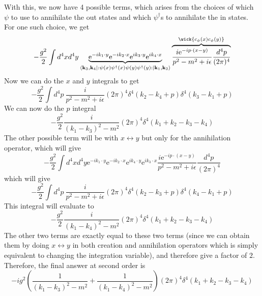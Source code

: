 \documentclass[11pt]{article}
\newcommand{\e}{\mathrm{e}}
\newcommand{\normord}[1]{:\mathrel{#1}:}
\renewcommand{\c}[1]{c_\mathbf{#1}}
\numberwithin{equation}{section}
\begin{document}
    With this, we now have 4 possible terms, which arises from the choices of which \(\psi\) to use to annihilate the out states and which \(\psi^\dagger\)s to annihilate the in states. For one such choice, we get 
    \begin{equation*}
        -\frac{g^2}{2} \int d^4x d^4y \underbrace{\e^{-ik_1\cdot y}\e^{-ik_2\cdot x}\e^{ik_3\cdot y}\e^{ik_4\cdot x}}_{\bra{\textbf{k}_3, \textbf{k}_4}\normord{\psi(x) \psi^\dagger(x) \psi(y) \psi^\dagger(y)}\ket{\textbf{k}_1, \textbf{k}_2}}  
        \overbrace{\frac{i\e^{-ip\cdot(x-y)}}{p^2 -m^2 + i\epsilon}\frac{d^4p}{(2\pi)^4}}^{ \wick{\c\phi(x)\c\phi(y)} }
    \end{equation*}
    Now we can do the \(x\) and \(y\) integrals to get 
    \begin{equation*}
        -\frac{g^2}{2} \int d^4p~
       \frac{i}{p^2 -m^2 + i\epsilon}(2\pi)^4\delta^4(k_2 - k_4 + p) \delta^4(k_3 - k_1 + p)
    \end{equation*}
    We can now do the \(p\) integral
    \begin{equation*}
        -\frac{g^2}{2} \frac{i}{(k_1-k_3)^2 - m^2} (2\pi)^4 \delta^4(k_1 + k_2 - k_3 - k_4)
    \end{equation*}
    The other possible term will be with \(x\leftrightarrow y\) but only for the annihilation operator, which will give 
    \begin{equation*}
        -\frac{g^2}{2} \int d^4x d^4y\e^{-ik_1\cdot y}\e^{-ik_2\cdot x}\e^{ik_4\cdot y}\e^{ik_3\cdot x}\frac{i\e^{-ip\cdot(x-y)}}{p^2 -m^2 + i\epsilon}\frac{d^4p}{(2\pi)^4}
    \end{equation*}
    which will give 
    \begin{equation*}
         -\frac{g^2}{2} \int d^4p~  \frac{i}{p^2 -m^2 + i\epsilon}(2\pi)^4\delta^4(k_2 - k_3 + p) \delta^4(k_4 - k_1 + p)
    \end{equation*}
    This integral will evaluate to 
    \begin{equation*}
        -\frac{g^2}{2} \frac{i}{(k_1-k_4)^2 - m^2} (2\pi)^4 \delta^4(k_1 + k_2 - k_3 - k_4)
    \end{equation*}    
    The other two terms are exactly equal to these two terms (since we can obtain them by doing \(x\leftrightarrow y\) in both creation and annihilation operators which is simply equivalent to changing the integration variable), and therefore give a factor of \(2\). Therefore, the final answer at second order is 
    \begin{equation*}
        -ig^2 \left(  \frac{1}{(k_1-k_3)^2 - m^2}  +   \frac{1}{(k_1-k_4)^2 - m^2}  \right)(2\pi)^4 \delta^4(k_1 + k_2 - k_3 - k_4)
    \end{equation*}
\end{document}
